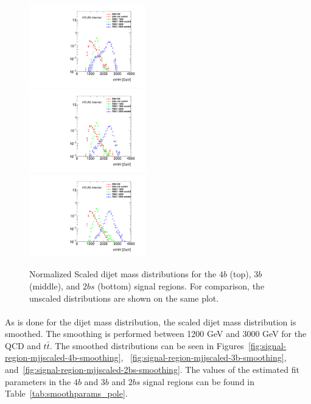 \begin{figure}[htbp!]
\begin{center}
\includegraphics[angle=270, width=0.45\textwidth]{figures/boosted/Other/FourTag_Signal_compare_scale_mHH_1.pdf}\\
\includegraphics[angle=270, width=0.45\textwidth]{figures/boosted/Other/ThreeTag_Signal_compare_scale_mHH_1.pdf}\\
\includegraphics[angle=270, width=0.45\textwidth]{figures/boosted/Other/TwoTag_split_Signal_compare_scale_mHH_1.pdf}
\caption{Normalized Scaled dijet mass distributions for the $4b$ (top), $3b$ (middle), and $2bs$ (bottom) signal regions.  For comparison, the unscaled distributions are shown on the same plot. }
\label{fig:signal-region-bkg-scaled}
\end{center}
\end{figure}

\paragraph{}
As is done for the dijet mass distribution,  the scaled dijet mass distribution is smoothed. The smoothing is performed between 1200 GeV and 3000 GeV for the QCD  and $t\bar{t}$. The smoothed distributions can be seen in Figures~\ref{fig:signal-region-mjjscaled-4b-smoothing}, ~\ref{fig:signal-region-mjjscaled-3b-smoothing}, and~\ref{fig:signal-region-mjjscaled-2bs-smoothing}. The values of the estimated fit parameters in the $4b$ and $3b$ and $2bs$ signal regions can be found in Table~\ref{tab:smoothparams_pole}.

